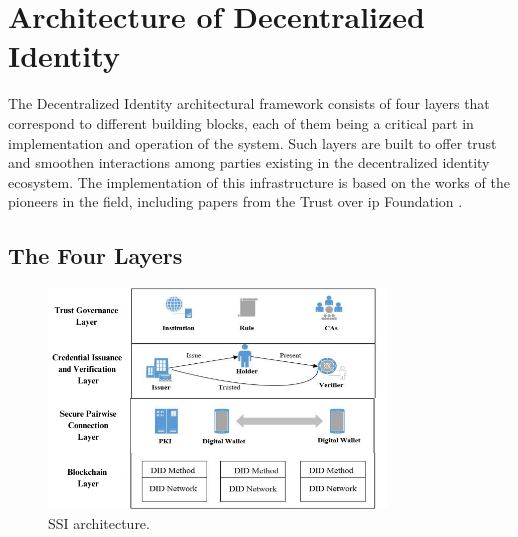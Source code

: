 \section{Architecture of Decentralized Identity} 

The Decentralized Identity architectural framework consists of four layers that correspond to different building blocks, each of them being a critical part in implementation
and operation of the system. Such layers are built to offer trust and smoothen interactions among parties existing in the decentralized identity ecosystem. The 
implementation of this infrastructure is based on the works of the pioneers in the field, including papers from the Trust over \gls{ip} Foundation \cite{DIDarchitecture}.

\subsection{The Four Layers} 

\begin{figure}[h]  
  \centering
  \includegraphics[width=0.8\textwidth]{Images/c4_5.png} 
  \caption{SSI architecture.}
\end{figure}

